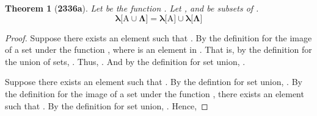 \documentclass[preview]{standalone}
\newtheorem*{theorem*}{Theorem}
\begin{document}
\begin{theorem*}[\textbf{2336a}]
    Let \bm{$\lambda$} be the function 
    \bm{$\lambda: \Gamma \to \Phi$}. 
    Let , and \bm{$\Lambda$} be subsets of \bm{$\Gamma$}. 
    \begin{equation*}
        \bm{
            \lambda \big[ \mathrm{A} \cup \Lambda \big] 
                = 
            \lambda \big[ \mathrm{A} \big] \cup \lambda \big[ \Lambda \big]
        }
    \end{equation*}
\end{theorem*}

\begin{proof}
    Suppose there exists an element \bm{$\phi$} such that
    .
    By the definition for the image of a set under the function \bm{$\lambda$},
    \bm{$\phi = \lambda \big[ \iota \big]$} 
    where \bm{$\iota$} is an element in . 
    That is, by the definition for the union of sets,
    . 
    Thus, 
    .
    And by the definition for set union, 
    .
    
    Suppose there exists an element \bm{$\phi$} such that 
    .
    By the defintion for set union, 
    .
    By the definition for the image of a set under the function \bm{$\lambda$},
    there exists an element  such that 
    \bm{$\lambda \big[ \iota \big] = \phi$}.
    By the definition for set union, 
    .
    Hence,
\color{lightgray} \end{proof}
\end{document}
